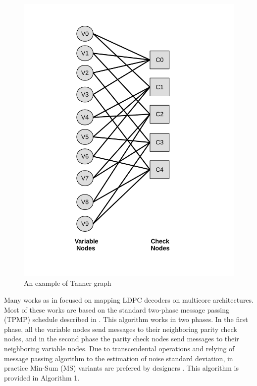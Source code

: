 \documentclass[conference]{IEEEtran}
\begin{document}
\begin{figure}[h]\label{tanner}
\begin{centering}
\includegraphics[scale=0.35]{tanner.pdf}
\caption[width=.3\textwidth]{An example of Tanner graph}
\end{centering}
\end{figure}

Many works as in \cite{art_massively, art_ldpc_cpu0,art_ldpc_OpenCl_1,art_gpu_0} focused on mapping LDPC decoders on multicore architectures. Most of these works are based on the standard two-phase message passing (TPMP) schedule described in \cite{art_massively}. This algorithm works in two phases. In the first phase, all the variable nodes send messages to their neighboring parity check nodes, and in the second phase the parity check nodes send messages to their neighboring variable nodes. Due to transcendental operations and relying of message passing algorithm to the estimation of noise standard deviation, in practice Min-Sum (MS) variants are prefered by designers \cite{art_neon}. This algorithm is provided in Algorithm 1.
\end{document}

